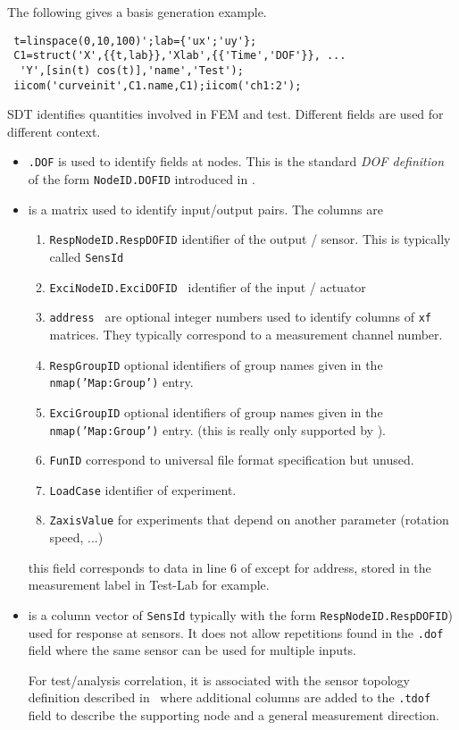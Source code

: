 The following gives a basis generation example. 

\begin{verbatim}
 t=linspace(0,10,100)';lab={'ux';'uy'};
 C1=struct('X',{{t,lab}},'Xlab',{{'Time','DOF'}}, ...
  'Y',[sin(t) cos(t)],'name','Test');
 iicom('curveinit',C1.name,C1);iicom('ch1:2');
\end{verbatim}%


SDT identifies quantities involved in FEM and test. Different fields are used for different context. 
\begin{itemize}
 \item {\tt .DOF} is used to identify fields at nodes. This is the standard {\sl DOF definition} of the form {\tt NodeID.DOFID} introduced in . 
 \item {} is a matrix used to identify input/output pairs. The columns are
 \begin{enumerate}
  \item {\tt RespNodeID.RespDOFID} identifier of the output / sensor. This is typically called {\tt SensId}
  \item {\tt ExciNodeID.ExciDOFID } identifier of the input / actuator
  \item {\tt address } are optional integer numbers used to identify columns of {\tt xf} matrices. They typically correspond to a measurement channel number.
  \item {\tt RespGroupID} optional identifiers of group names given in the {\tt nmap('Map:Group')} entry. 
  \item {\tt ExciGroupID} optional identifiers of group names given in the {\tt nmap('Map:Group')} entry. (this is really only supported by \ufread). 

  \item {\tt FunID} correspond to universal file format specification but unused. 
  \item {\tt LoadCase} identifier of experiment.
  \item {\tt ZaxisValue} for experiments that depend on another parameter (rotation speed, ...)
 \end{enumerate} 
this field corresponds to data in line 6 of  except for address, stored in the measurement label in Test-Lab for example. 

\item {} is a column vector of {\tt SensId} typically with the form {\tt RespNodeID.RespDOFID}) used for response at sensors. It does not allow repetitions found in the {\tt .dof} field where the same sensor can be used for multiple inputs.  

For test/analysis correlation, it is associated with the sensor topology definition described in~ where additional columns are added to the {\tt .tdof} field to describe the supporting node and a general measurement direction. 
 
\end{itemize}




